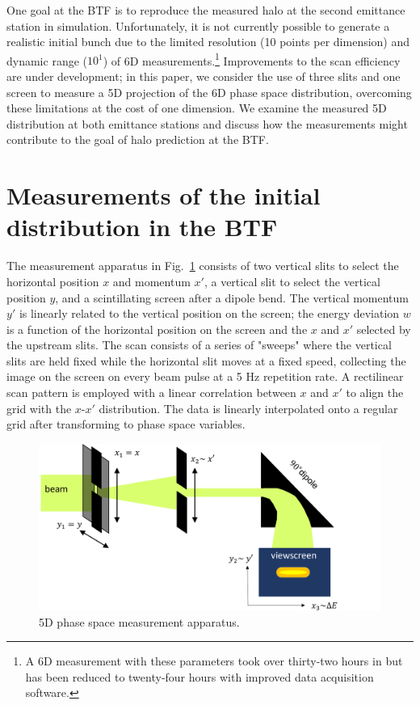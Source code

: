 \documentclass[letterpaper,
               keeplastbox,
               nospread,
               biblatex,
              ]{jacow}
\begin{document}
One goal at the BTF is to reproduce the measured halo at the second emittance station in simulation. Unfortunately, it is not currently possible to generate a realistic initial bunch due to the limited resolution (10 points per dimension) and dynamic range ($10^1$) of 6D measurements.\footnote{A 6D measurement with these parameters took over thirty-two hours in \cite{Cathey2018} but has been reduced to twenty-four hours with improved data acquisition software.} Improvements to the scan efficiency are under development; in this paper, we consider the use of three slits and one screen to measure a 5D projection of the 6D phase space distribution, overcoming these limitations at the cost of one dimension. We examine the measured 5D distribution at both emittance stations and discuss how the measurements might contribute to the goal of halo prediction at the BTF.

\section{Measurements of the initial distribution in the BTF}

The measurement apparatus in Fig.~\ref{fig:5dmeas} consists of two vertical slits to select the horizontal position $x$ and momentum $x'$, a vertical slit to select the vertical position $y$, and a scintillating screen after a dipole bend. The vertical momentum $y'$ is linearly related to the vertical position on the screen; the energy deviation $w$ is a function of the horizontal position on the screen and the $x$ and $x'$ selected by the upstream slits. The scan consists of a series of "sweeps" where the vertical slits are held fixed while the horizontal slit moves at a fixed speed, collecting the image on the screen on every beam pulse at a 5 Hz repetition rate. A rectilinear scan pattern is employed with a linear correlation between $x$ and $x'$ to align the grid with the $x$-$x'$ distribution. The data is linearly interpolated onto a regular grid after transforming to phase space variables.

\begin{figure}[!t]
    \centering
    \includegraphics[width=\columnwidth]{apparatus5D.png}
    \caption{5D phase space measurement apparatus.}
    \label{fig:5dmeas}
\end{figure}
\end{document}
